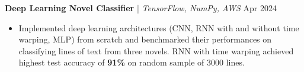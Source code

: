 \textbf{Deep Learning Novel Classifier} | \textit{TensorFlow, NumPy, AWS} \hfill Apr 2024 \par
\begin{itemize}
	\item Implemented deep learning architectures (CNN, RNN with and without time warping, MLP) from scratch and benchmarked their performances on classifying lines of text from three novels. RNN with time warping achieved highest test accuracy of \textbf{91\%} on random sample of 3000 lines.
\end{itemize}